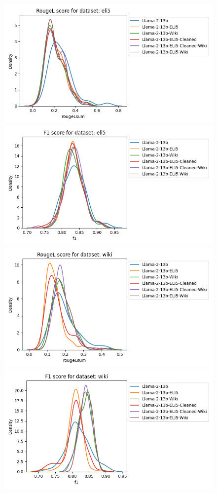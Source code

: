\documentclass[11pt, oneside]{article}   	%
\begin{document}
\begin{figure}
\includegraphics[scale=.5]{./figures/rougelsum_13B_eli5}
\includegraphics[scale=.5]{./figures/bertscore_F1_13B_eli5}
\includegraphics[scale=.5]{./figures/rougelsum_13B_wiki}
\includegraphics[scale=.5]{./figures/bertscore_F1_13B_wiki}

\end{figure}
\end{document}
